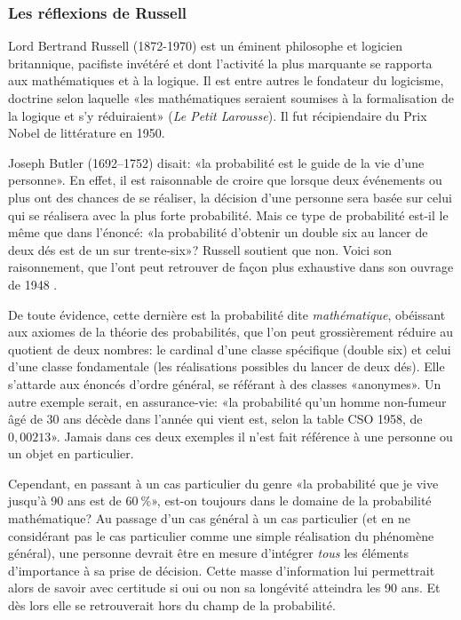 \subsubsection{Les réflexions de Russell}
\label{sec:introduction-historique:russell}

Lord Bertrand Russell (1872-1970) est un éminent philosophe et
logicien britannique, pacifiste invétéré et dont l'activité la plus
marquante se rapporta aux mathématiques et à la logique. Il est entre
autres le fondateur du logicisme, doctrine selon laquelle «les
mathématiques seraient soumises à la formalisation de la logique et
s'y réduiraient» (\emph{Le Petit Larousse}). Il fut récipiendaire du
Prix Nobel de littérature en 1950.

Joseph Butler (1692--1752) disait: «la probabilité est le guide de la
vie d'une personne».  En effet, il est raisonnable de croire que
lorsque deux événements ou plus ont des chances de se réaliser, la
décision d'une personne sera basée sur celui qui se réalisera avec la
plus forte probabilité. Mais ce type de probabilité est-il le même que
dans l'énoncé: «la probabilité d'obtenir un double six au lancer de
deux dés est de un sur trente-six»? Russell soutient que non. Voici
son raisonnement, que l'ont peut retrouver de façon plus exhaustive
dans son ouvrage de 1948 \citep{Russell:human:1948}.

De toute évidence, cette dernière est la probabilité dite
\emph{mathématique}, obéissant aux axiomes de la théorie des
probabilités, que l'on peut grossièrement réduire au quotient de deux
nombres: le cardinal d'une classe spécifique (double six) et celui
d'une classe fondamentale (les réalisations possibles du lancer de
deux dés). Elle s'attarde aux énoncés d'ordre général, se référant à
des classes «anonymes». Un autre exemple serait, en assurance-vie: «la
probabilité qu'un homme non-fumeur âgé de 30 ans décède dans l'année
qui vient est, selon la table CSO 1958, de $0,00213$». Jamais dans ces
deux exemples il n'est fait référence à une personne ou un objet en
particulier.

Cependant, en passant à un cas particulier du genre «la probabilité
que je vive jusqu'à 90 ans est de $60~\%$», est-on toujours dans le
domaine de la probabilité mathématique? Au passage d'un cas général à
un cas particulier (et en ne considérant pas le cas particulier comme
une simple réalisation du phénomène général), une personne devrait
être en mesure d'intégrer \emph{tous} les éléments d'importance à sa
prise de décision. Cette masse d'information lui permettrait alors de
savoir avec certitude si oui ou non sa longévité atteindra les 90 ans.
Et dès lors elle se retrouverait hors du champ de la probabilité.

